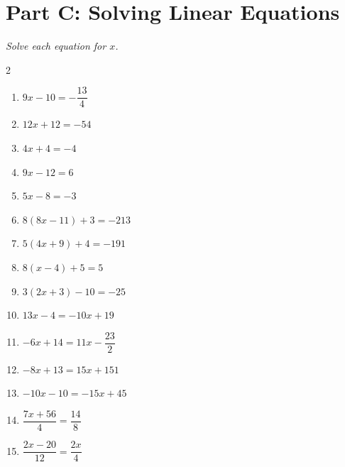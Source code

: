 \documentclass[11pt]{article}
\begin{document}
\section*{Part C: Solving Linear Equations}
\noindent\textit{Solve each equation for $x$.}
\begin{multicols}{2}
\begin{enumerate}
  \item $9x - 10 = -\dfrac{13}{4}$
  \vspace{1.8cm}
  \item $12x + 12 = -54$
  \vspace{1.8cm}
  \item $4x + 4 = -4$
  \vspace{1.8cm}
  \item $9x - 12 = 6$
  \vspace{1.8cm}
  \item $5x - 8 = -3$
  \vspace{1.8cm}
  \item $8(8x - 11) + 3 = -213$
  \vspace{1.8cm}
  \item $5(4x + 9) + 4 = -191$
  \vspace{1.8cm}
  \item $8(x - 4) + 5 = 5$
  \vspace{1.8cm}
  \item $3(2x + 3) - 10 = -25$
  \vspace{1.8cm}
  \item $13x - 4 = -10x + 19$
  \vspace{1.8cm}
  \item $-6x + 14 = 11x - \dfrac{23}{2}$
  \vspace{1.8cm}
  \item $-8x + 13 = 15x + 151$
  \vspace{1.8cm}
  \item $-10x - 10 = -15x + 45$
  \vspace{1.8cm}
  \item $\dfrac{7x + 56}{4} = \dfrac{14}{8}$
  \vspace{1.8cm}
  \item $\dfrac{2x - 20}{12} = \dfrac{2x}{4}$
  \vspace{1.8cm}
\end{enumerate}
\end{multicols}
\end{document}
